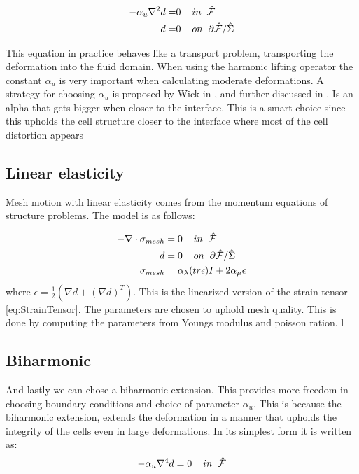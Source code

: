 \begin{align}
 - \alpha_u \nabla^2 d =& 0\hspace{4mm} in \hspace{2mm} \hat{\mathcal{F}}\\
  \hspace{4mm} d =& 0 \hspace{4mm } on \hspace{2mm }  \partial \hat{\mathcal{F}} / \hat{\Sigma}
\end{align}

This equation in practice behaves like a transport problem, transporting the deformation into the fluid domain.
When using the harmonic lifting operator the constant $\alpha_u$ is very important when calculating moderate deformations. A strategy for choosing $\alpha_u$ is proposed by Wick in \cite{Wick2011a}, and further discussed in \cite{Stein2003}. Is an alpha that gets bigger when closer to the interface. This is a smart choice since this upholds the cell structure closer to the interface where most of the cell distortion appears

\subsection{Linear elasticity}
Mesh motion with linear elasticity comes from the momentum equations of structure problems. The model is as follows:

\begin{align}
-\nabla \cdot \sigma_{mesh} &= 0 \hspace{4mm} in \hspace{2mm} \hat{\mathcal{F}}\\
\hspace{4mm} d &= 0 \hspace{4mm } on \hspace{2mm }  \partial \hat{\mathcal{F}} / \hat{\Sigma} \\
\sigma_{mesh} &= \alpha_\lambda (tr\epsilon)I + 2\alpha_\mu \epsilon 
\end{align}
where $\epsilon = \frac{1}{2}(\nabla d + (\nabla d)^T)$. This is the linearized version of the strain tensor \eqref{eq:StrainTensor}. The parameters are chosen to uphold mesh quality. This is done by computing the parameters from Youngs modulus and poisson ration. l

\subsection{Biharmonic} 
And lastly we can chose a biharmonic extension. This provides more freedom in choosing boundary conditions and choice of parameter $\alpha_u$. This is because the biharmonic extension, extends the deformation in a manner that upholds the integrity of the cells even in large deformations. In its simplest form it is written as:
\begin{equation}
- \alpha_u \nabla^4 d = 0 \hspace{4mm}  in \hspace{2mm} \hat{\mathcal{F}}\\
\end{equation}


